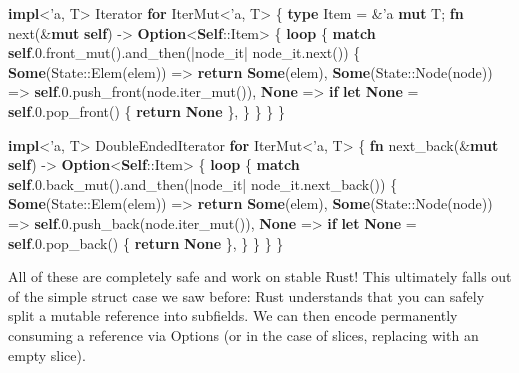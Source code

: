 \documentclass[a4paper,]{book}
\newenvironment{Shaded}{\begin{snugshade}}{\end{snugshade}}
\newcommand{\KeywordTok}[1]{\textcolor[rgb]{0.13,0.29,0.53}{\textbf{{#1}}}}
\newcommand{\DecValTok}[1]{\textcolor[rgb]{0.00,0.00,0.81}{{#1}}}
\newcommand{\OtherTok}[1]{\textcolor[rgb]{0.56,0.35,0.01}{{#1}}}
\newcommand{\NormalTok}[1]{{#1}}
\begin{document}
\begin{Shaded}
\begin{Highlighting}[]
\KeywordTok{impl}\NormalTok{<}\OtherTok{'a}\NormalTok{, T> Iterator }\KeywordTok{for} \NormalTok{IterMut<}\OtherTok{'a}\NormalTok{, T> \{}
    \KeywordTok{type} \NormalTok{Item = &}\OtherTok{'a} \KeywordTok{mut} \NormalTok{T;}
    \KeywordTok{fn} \NormalTok{next(&}\KeywordTok{mut} \KeywordTok{self}\NormalTok{) -> }\KeywordTok{Option}\NormalTok{<}\KeywordTok{Self}\NormalTok{::Item> \{}
        \KeywordTok{loop} \NormalTok{\{}
            \KeywordTok{match} \KeywordTok{self}\NormalTok{.}\DecValTok{0.f}\NormalTok{ront_mut().and_then(|node_it| node_it.next()) \{}
                \KeywordTok{Some}\NormalTok{(State::Elem(elem)) => }\KeywordTok{return} \KeywordTok{Some}\NormalTok{(elem),}
                \KeywordTok{Some}\NormalTok{(State::Node(node)) => }\KeywordTok{self}\NormalTok{.}\DecValTok{0.}\NormalTok{push_front(node.iter_mut()),}
                \KeywordTok{None} \NormalTok{=> }\KeywordTok{if} \KeywordTok{let} \KeywordTok{None} \NormalTok{= }\KeywordTok{self}\NormalTok{.}\DecValTok{0.}\NormalTok{pop_front() \{ }\KeywordTok{return} \KeywordTok{None} \NormalTok{\},}
            \NormalTok{\}}
        \NormalTok{\}}
    \NormalTok{\}}
\NormalTok{\}}

\KeywordTok{impl}\NormalTok{<}\OtherTok{'a}\NormalTok{, T> DoubleEndedIterator }\KeywordTok{for} \NormalTok{IterMut<}\OtherTok{'a}\NormalTok{, T> \{}
    \KeywordTok{fn} \NormalTok{next_back(&}\KeywordTok{mut} \KeywordTok{self}\NormalTok{) -> }\KeywordTok{Option}\NormalTok{<}\KeywordTok{Self}\NormalTok{::Item> \{}
        \KeywordTok{loop} \NormalTok{\{}
            \KeywordTok{match} \KeywordTok{self}\NormalTok{.}\DecValTok{0.}\NormalTok{back_mut().and_then(|node_it| node_it.next_back()) \{}
                \KeywordTok{Some}\NormalTok{(State::Elem(elem)) => }\KeywordTok{return} \KeywordTok{Some}\NormalTok{(elem),}
                \KeywordTok{Some}\NormalTok{(State::Node(node)) => }\KeywordTok{self}\NormalTok{.}\DecValTok{0.}\NormalTok{push_back(node.iter_mut()),}
                \KeywordTok{None} \NormalTok{=> }\KeywordTok{if} \KeywordTok{let} \KeywordTok{None} \NormalTok{= }\KeywordTok{self}\NormalTok{.}\DecValTok{0.}\NormalTok{pop_back() \{ }\KeywordTok{return} \KeywordTok{None} \NormalTok{\},}
            \NormalTok{\}}
        \NormalTok{\}}
    \NormalTok{\}}
\NormalTok{\}}
\end{Highlighting}
\end{Shaded}

All of these are completely safe and work on stable Rust! This
ultimately falls out of the simple struct case we saw before: Rust
understands that you can safely split a mutable reference into
subfields. We can then encode permanently consuming a reference via
Options (or in the case of slices, replacing with an empty slice).
\end{document}
